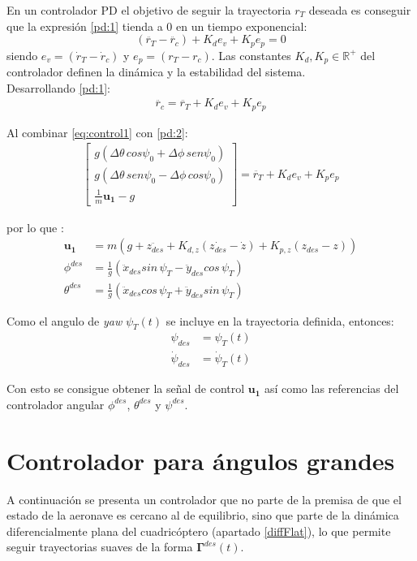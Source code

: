 En un controlador PD el objetivo de seguir la trayectoria $r_T$ deseada es conseguir que la expresión \ref{pd:1} tienda a 0 en un tiempo exponencial:
\begin{equation}
	\label{pd:1}
	\left(\ddot{r_T} - \ddot{r_c}\right) + K_d e_v + K_p e_p = 0
\end{equation}
siendo $e_v = (\dot r_T - \dot r_c )$ y $e_p = (r_T - r_c )$. Las constantes $K_d,K_p \in \mathbb{R^+}$ del controlador definen la dinámica y la estabilidad del sistema.
\\

Desarrollando \ref{pd:1}:
\begin{align}
	\label{pd:2}
	\ddot{r_c} = \ddot{r_T} + K_d e_v + K_p e_p
\end{align}

Al combinar \ref{eq:control1} con \ref{pd:2}:
\begin{align}\begin{bmatrix}
		g (\Delta\theta\, cos \psi_0 + \Delta\phi\,sen\psi_0)\\
		g(\Delta\theta\, sen \psi_0  - \Delta\phi\,cos\psi_0) \\
		\frac{1}{m}\mathbf{u_1}-g
	\end{bmatrix} 	= \ddot{r_T} + K_d e_v + K_p e_p
\end{align}

por lo que :
\begin{align}
	\mathbf{u_1} &=m\left(g + \ddot{z_{des}}+ K_{d,z}(\dot{z_{des}}-\dot{z}) + K_{p,z}(z_{des}-z)\right)\\
	\phi^{des} &= \frac{1}{g}\left(\ddot{x}_{des} sin\,\psi_T -\ddot{y}_{des} cos\,\psi_T \right)\\
	\theta^{des} &= \frac{1}{g}\left(\ddot{x}_{des} cos\,\psi_T +\ddot{y}_{des} sin\,\psi_T \right)
\end{align}

Como el angulo de \textit{yaw} $\psi_T(t)$ se incluye en la trayectoria definida, entonces:
\begin{align}
	\psi_{des} &= \psi_T(t)\\
		\dot\psi_{des} &= \dot\psi_T(t)
\end{align} 

Con esto se consigue obtener la señal de control $\mathbf{u_1}$ así como las referencias del controlador angular $\phi^{des}$, $\theta^{des}$ y $\psi^{des}$.

\section{Controlador para ángulos grandes}
A continuación se presenta un controlador que no parte de la premisa de que el estado de la aeronave es cercano al de equilibrio, sino que parte de la dinámica diferencialmente plana del cuadricóptero (apartado \ref{diffFlat}), lo que permite seguir trayectorias suaves de la forma $\mathbf{\Gamma}^{des}(t)$.


